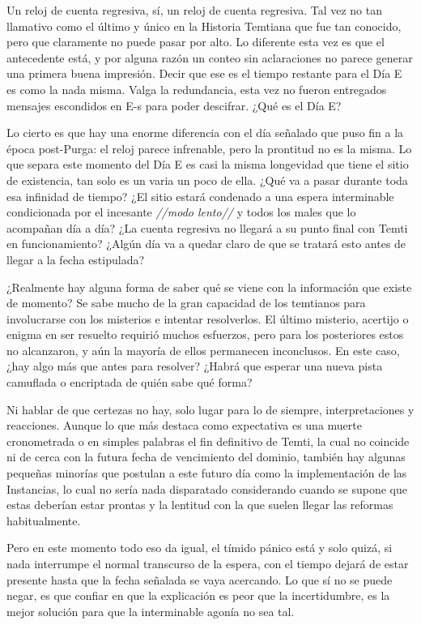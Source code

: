 \documentclass[
  spanish,
]{book}
\begin{document}
Un reloj de cuenta regresiva, sí, un reloj de cuenta regresiva. Tal vez no tan llamativo como el último y único en la Historia Temtiana que fue tan conocido, pero que claramente no puede pasar por alto. Lo diferente esta vez es que el antecedente está, y por alguna razón un conteo sin aclaraciones no parece generar una primera buena impresión. Decir que ese es el tiempo restante para el Día E es como la nada misma. Valga la redundancia, esta vez no fueron entregados mensajes escondidos en E-s para poder descifrar. ¿Qué es el Día E?

Lo cierto es que hay una enorme diferencia con el día señalado que puso fin a la época post-Purga: el reloj parece infrenable, pero la prontitud no es la misma. Lo que separa este momento del Día E es casi la misma longevidad que tiene el sitio de existencia, tan solo es un varia un poco de ella. ¿Qué va a pasar durante toda esa infinidad de tiempo? ¿El sitio estará condenado a una espera interminable condicionada por el incesante \emph{//modo lento//} y todos los males que lo acompañan día a día? ¿La cuenta regresiva no llegará a su punto final con Temti en funcionamiento? ¿Algún día va a quedar claro de que se tratará esto antes de llegar a la fecha estipulada?

¿Realmente hay alguna forma de saber qué se viene con la información que existe de momento? Se sabe mucho de la gran capacidad de los temtianos para involucrarse con los misterios e intentar resolverlos. El último misterio, acertijo o enigma en ser resuelto requirió muchos esfuerzos, pero para los posteriores estos no alcanzaron, y aún la mayoría de ellos permanecen inconclusos. En este caso, ¿hay algo más que antes para resolver? ¿Habrá que esperar una nueva pista camuflada o encriptada de quién sabe qué forma?

Ni hablar de que certezas no hay, solo lugar para lo de siempre, interpretaciones y reacciones. Aunque lo que más destaca como expectativa es una muerte cronometrada o en simples palabras el fin definitivo de Temti, la cual no coincide ni de cerca con la futura fecha de vencimiento del dominio, también hay algunas pequeñas minorías que postulan a este futuro día como la implementación de las Instancias, lo cual no sería nada disparatado considerando cuando se supone que estas deberían estar prontas y la lentitud con la que suelen llegar las reformas habitualmente.

Pero en este momento todo eso da igual, el tímido pánico está y solo quizá, si nada interrumpe el normal transcurso de la espera, con el tiempo dejará de estar presente hasta que la fecha señalada se vaya acercando. Lo que sí no se puede negar, es que confiar en que la explicación es peor que la incertidumbre, es la mejor solución para que la interminable agonía no sea tal.
\end{document}
